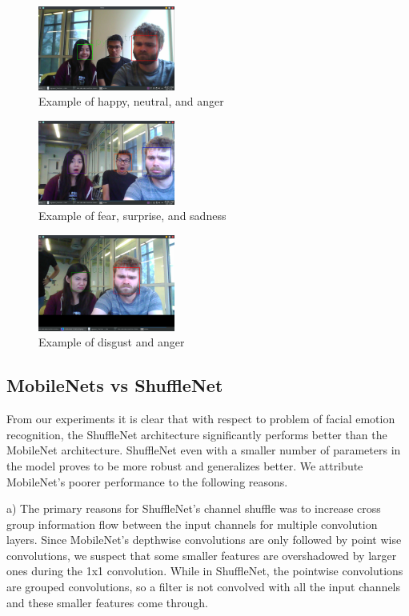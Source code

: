 \documentclass[10pt,twocolumn,letterpaper]{article}
\begin{document}
\begin{figure}[ht]
\caption{Example of happy, neutral, and anger}
\centering
\includegraphics[width=0.4\textwidth]{happy_neutral_angry}
\end{figure}

\begin{figure}[ht]
\caption{Example of fear, surprise, and sadness}
\centering
\includegraphics[width=0.4\textwidth]{fear_surprise_sad}
\end{figure}

\begin{figure}[ht]
\caption{Example of disgust and anger}
\centering
\includegraphics[width=0.4\textwidth]{disgust_anger}
\end{figure}

\subsection{MobileNets vs ShuffleNet}

From our experiments it is clear that with respect to problem of facial emotion recognition, the ShuffleNet architecture significantly performs better than the MobileNet architecture. ShuffleNet even with a smaller number of parameters in the model proves to be more robust and generalizes better. 
We attribute MobileNet’s poorer performance to the following reasons.
 
a) The primary reasons for ShuffleNet’s channel shuffle was to increase cross group information flow between the input channels for multiple convolution layers. Since MobileNet’s depthwise convolutions are only followed by point wise convolutions, we suspect that some  smaller features are overshadowed by larger ones during the 1x1 convolution. While in ShuffleNet, the pointwise convolutions are grouped convolutions, so a filter is not convolved with all the input channels and these smaller features come through.
\end{document}

